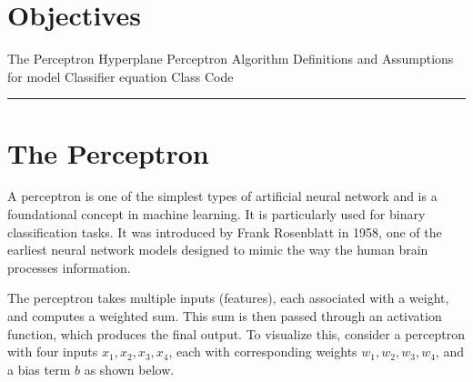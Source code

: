 \section*{Objectives}
\begin{outline}
    \1 The Perceptron 
    \1 Hyperplane
    \1 Perceptron Algorithm
    \1 Definitions and Assumptions for model
    \1 Classifier equation
    \1 Class Code
\end{outline}

\rule[0.0051in]{\textwidth}{0.00025in}

\section{The Perceptron}

A perceptron is one of the simplest types of artificial neural network and is a foundational concept in machine learning. It is particularly used for binary classification tasks. It was introduced by Frank Rosenblatt in 1958, one of the earliest neural network models designed to mimic the way the human brain processes information.

The perceptron takes multiple inputs (features), each associated with a weight, and computes a weighted sum. This sum is then passed through an activation function, which produces the final output. To visualize this, consider a perceptron with four inputs \( x_1, x_2, x_3, x_4 \), each with corresponding weights \( w_1, w_2, w_3, w_4 \), and a bias term \( b \) as shown below.

